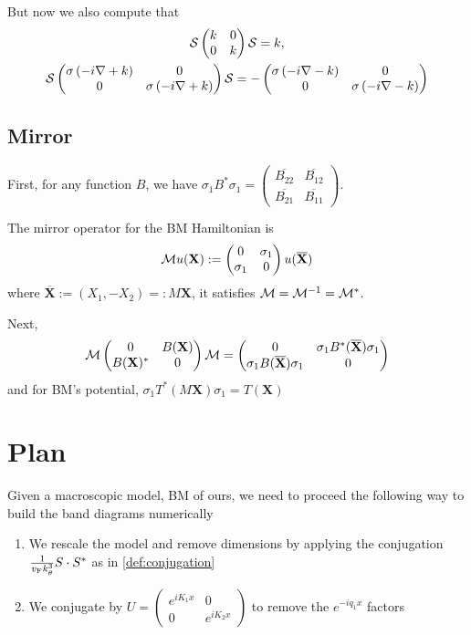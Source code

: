 \documentclass[11pt,a4paper,reqno,french,tikz]{amsart}
\newcommand{\pa}[1]{\left( #1 \right)} %
\newcommand{\na}{\nabla} %
\newcommand{\f}[2]{\frac{#1}{#2}} %
\newcommand{\ind}[1]{_{\textup{#1}}} %
\newcommand{\mat}[1]{\begin{pmatrix} #1 \end{pmatrix}} %
\def\bX{{\mathbf X}}
\begin{document}
But now we also compute that
\begin{multline*}
	\cS \mat{k & 0 \\ 0 & k} \cS = k, \\
	\cS \mat{\sigma \pa{-i\na +k} & 0 \\ 0 & \sigma\pa{-i\na +k}} \cS = -\mat{\sigma\pa{-i\na -k} & 0 \\ 0 & \sigma\pa{-i\na -k}}
\end{multline*}

\subsection{Mirror}%
\label{sub:mirror}

First, for any function $B$, we have $\sigma_1 B^* \sigma_1 = \mat{\overline{B_{22}} & \overline{B_{12}} \\ \overline{B_{21}} & \overline{B_{11}}}$.


The mirror operator for the BM Hamiltonian is
\begin{align*}
	\cM u(\bX) := \mat{0 & \sigma_1 \\ \sigma_1 & 0} u(\overline{\bX})
\end{align*}
where $\overline{\bX} := (X_1,-X_2) =: M \bX$, it satisfies $\mathcal{M} = \mathcal{M}^{-1} = \mathcal{M}^*$.


Next,
\begin{align*}
	\cM \mat{0 & B(\bX) \\ B(\bX)^* & 0} \cM = \mat{0 & \sigma_1 B^*(\overline{\bX}) \sigma_1 \\ \sigma_1 B(\overline{\bX}) \sigma_1 & 0}%
\end{align*}
and for BM's potential, $\sigma_1 T^*(M \bX) \sigma_1 = T(\bX)$




\section{Plan}%
\label{sec:plan}

Given a macroscopic model, BM of ours, we need to proceed the following way to build the band diagrams numerically
\begin{enumerate}
	\item We rescale the model and remove dimensions by applying the conjugation $\f{1}{v\ind{F} k_\theta^3} S \cdot S^*$ as in \eqref{def:conjugation}
	\item We conjugate by $U = \mat{e^{i K_1 x} & 0 \\ 0 & e^{iK_2 x}}$ to remove the $e^{-iq_1 x}$ factors
\end{enumerate}
\end{document}
